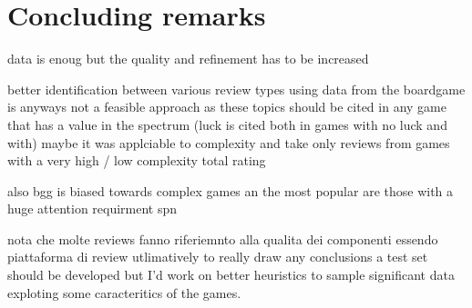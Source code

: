 \section{Concluding remarks}

data is enoug but the quality and refinement has to be increased

better identification between various review types
using data from the boardgame is anyways not a feasible approach as these topics should
be cited in any game that has a value in the spectrum (luck is cited both in games with no luck and with)
maybe it was applciable to complexity and take only reviews from games with a very high / low complexity total rating

also bgg is biased towards complex games an the most popular are those with a huge
attention requirment spn

nota che molte reviews fanno riferiemnto alla qualita dei componenti essendo piattaforma di review
utlimatively to really draw any conclusions a test set should be developed but I'd work on
better heuristics to sample significant data exploting some caracteritics of the games.
